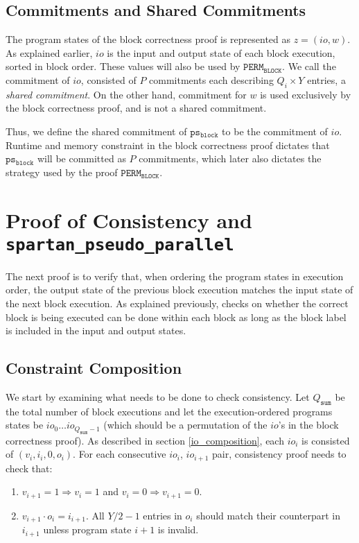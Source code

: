 \documentclass{article}
\newcommand{\code}{\texttt}
\newcommand{\Qsum}{Q_{\mathtt{sum}}}
\newcommand{\PERMB}{\mathtt{PERM_{BLOCK}}}
\newcommand{\psb}{\mathtt{ps_{block}}}
\begin{document}
\subsection{Commitments and Shared Commitments}

The program states of the block correctness proof is represented as $z = (io, w)$. As explained earlier, $io$ is the input and output state of each block execution, sorted in block order. These values will also be used by $\PERMB$. We call the commitment of $io$, consisted of $P$ commitments each describing $Q_i \times Y$ entries, a \emph{shared commitment}. On the other hand, commitment for $w$ is used exclusively by the block correctness proof, and is not a shared commitment.

Thus, we define the shared commitment of $\psb$ to be the commitment of $io$. Runtime and memory constraint in the block correctness proof dictates that $\psb$ will be committed as $P$ commitments, which later also dictates the strategy used by the proof $\PERMB$.


\section{Proof of Consistency and \code{spartan\_pseudo\_parallel}}\label{sec:consistency}

The next proof is to verify that, when ordering the program states in execution order, the output state of the previous block execution matches the input state of the next block execution. As explained previously, checks on whether the correct block is being executed can be done within each block as long as the block label is included in the input and output states.

\subsection{Constraint Composition}\label{consis_composition}

We start by examining what needs to be done to check consistency. Let $\Qsum$ be the total number of block executions and let the execution-ordered programs states be $io_0 \dots io_{\Qsum - 1}$ (which should be a permutation of the $io$'s in the block correctness proof). As described in section \ref{io_composition}, each $io_i$ is consisted of $(v_i, i_i, 0, o_i)$. For each consecutive $io_i$, $io_{i+1}$ pair, consistency proof needs to check that:
\begin{enumerate}
    \item $v_{i + 1} = 1 \Rightarrow v_i = 1$ and $v_i = 0 \Rightarrow v_{i + 1} = 0$.
    \item $v_{i + 1}\cdot o_i = i_{i + 1}$. All $Y / 2 - 1$ entries in $o_i$ should match their counterpart in $i_{i + 1}$ unless program state $i + 1$ is invalid.
\end{enumerate}
\end{document}
